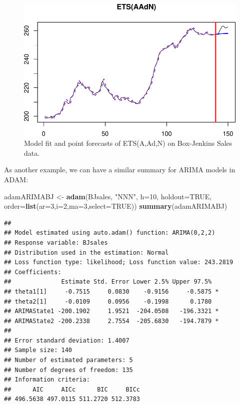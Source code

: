 \documentclass[]{book}
\newenvironment{Shaded}{\begin{snugshade}}{\end{snugshade}}
\newcommand{\DataTypeTok}[1]{\textcolor[rgb]{0.13,0.29,0.53}{#1}}
\newcommand{\DecValTok}[1]{\textcolor[rgb]{0.00,0.00,0.81}{#1}}
\newcommand{\KeywordTok}[1]{\textcolor[rgb]{0.13,0.29,0.53}{\textbf{#1}}}
\newcommand{\NormalTok}[1]{#1}
\newcommand{\OtherTok}[1]{\textcolor[rgb]{0.56,0.35,0.01}{#1}}
\newcommand{\StringTok}[1]{\textcolor[rgb]{0.31,0.60,0.02}{#1}}
\theoremstyle{definition}
\theoremstyle{definition}
\theoremstyle{definition}
\theoremstyle{definition}
\theoremstyle{remark}
\begin{document}
\begin{figure}
\centering
\includegraphics{Svetunkov--2022----ADAM_files/figure-latex/adamModelBJAAdN-1.pdf}
\caption{\label{fig:adamModelBJAAdN}Model fit and point forecasts of ETS(A,Ad,N) on Box-Jenkins Sales data.}
\end{figure}

As another example, we can have a similar summary for ARIMA models in ADAM:

\begin{Shaded}
\begin{Highlighting}[]
\NormalTok{adamARIMABJ <-}\StringTok{ }\KeywordTok{adam}\NormalTok{(BJsales, }\StringTok{"NNN"}\NormalTok{, }\DataTypeTok{h=}\DecValTok{10}\NormalTok{, }\DataTypeTok{holdout=}\OtherTok{TRUE}\NormalTok{,}
                    \DataTypeTok{order=}\KeywordTok{list}\NormalTok{(}\DataTypeTok{ar=}\DecValTok{3}\NormalTok{,}\DataTypeTok{i=}\DecValTok{2}\NormalTok{,}\DataTypeTok{ma=}\DecValTok{3}\NormalTok{,}\DataTypeTok{select=}\OtherTok{TRUE}\NormalTok{))}
\KeywordTok{summary}\NormalTok{(adamARIMABJ)}
\end{Highlighting}
\end{Shaded}

\begin{verbatim}
## 
## Model estimated using auto.adam() function: ARIMA(0,2,2)
## Response variable: BJsales
## Distribution used in the estimation: Normal
## Loss function type: likelihood; Loss function value: 243.2819
## Coefficients:
##              Estimate Std. Error Lower 2.5% Upper 97.5%  
## theta1[1]     -0.7515     0.0830    -0.9156     -0.5875 *
## theta2[1]     -0.0109     0.0956    -0.1998      0.1780  
## ARIMAState1 -200.1902     1.9521  -204.0508   -196.3321 *
## ARIMAState2 -200.2338     2.7554  -205.6830   -194.7879 *
## 
## Error standard deviation: 1.4007
## Sample size: 140
## Number of estimated parameters: 5
## Number of degrees of freedom: 135
## Information criteria:
##      AIC     AICc      BIC     BICc 
## 496.5638 497.0115 511.2720 512.3783
\end{verbatim}
\end{document}
